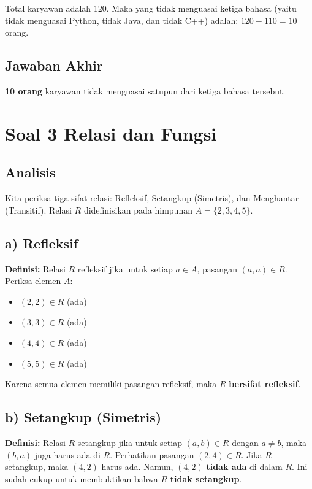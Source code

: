 \documentclass[12pt,a4paper]{article}
\begin{document}
Total karyawan adalah 120. Maka yang tidak menguasai ketiga bahasa (yaitu tidak menguasai Python, tidak Java, dan tidak C++) adalah:
$120 - 110 = 10$ orang.

\subsection*{Jawaban Akhir}
\textbf{10 orang} karyawan tidak menguasai satupun dari ketiga bahasa tersebut.

\newpage
\section*{Soal 3 Relasi dan Fungsi}
\subsection*{Analisis}
Kita periksa tiga sifat relasi: Refleksif, Setangkup (Simetris), dan Menghantar (Transitif). Relasi $R$ didefinisikan pada himpunan $A = \{2,3,4,5\}$.

\subsection*{a) Refleksif}
\textbf{Definisi:} Relasi $R$ refleksif jika untuk setiap $a \in A$, pasangan $(a,a) \in R$.
Periksa elemen $A$:
\begin{itemize}
    \item $(2,2) \in R$ (ada)
    \item $(3,3) \in R$ (ada)
    \item $(4,4) \in R$ (ada)
    \item $(5,5) \in R$ (ada)
\end{itemize}
Karena semua elemen memiliki pasangan refleksif, maka $R$ \textbf{bersifat refleksif}.

\subsection*{b) Setangkup (Simetris)}
\textbf{Definisi:} Relasi $R$ setangkup jika untuk setiap $(a,b) \in R$ dengan $a \neq b$, maka $(b,a)$ juga harus ada di $R$.
Perhatikan pasangan $(2,4) \in R$. Jika $R$ setangkup, maka $(4,2)$ harus ada. Namun, $(4,2)$ \textbf{tidak ada} di dalam $R$. Ini sudah cukup untuk membuktikan bahwa $R$ \textbf{tidak setangkup}.
\end{document}

